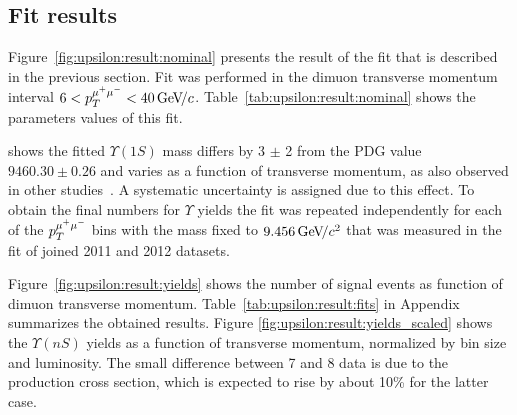 \subsection{Fit results}
\label{sec:upsilon:result}

Figure~\ref{fig:upsilon:result:nominal} presents the result of the fit that is
described in the previous section. Fit was performed in the dimuon
transverse momentum interval $ 6 < p_T^{\mu^+\mu^-} < 40 {\mathrm{\,Ge\kern -0.1em V\!/}c}$.
Table~\ref{tab:upsilon:result:nominal} shows the parameters values of this fit.







% 


 shows  the fitted $\Upsilon(1S)$
mass differs by 3 $\pm$ 2 \mevcc from the PDG value $9460.30 \pm  0.26$ \mevcc and
varies as a function of transverse momentum, as also observed in other
studies~\cite{Aaij:2013yaa}. A systematic uncertainty is assigned due to this
effect. To obtain the final numbers for $\Upsilon$ yields the fit was repeated
independently for each of the $p_T^{\mu^+\mu^-}$ bins with the \OneS mass fixed to
$9.456 {\mathrm{\,Ge\kern -0.1em V\!/}c^2}$ that was measured in the fit of joined 2011 and 2012 datasets.

Figure~\ref{fig:upsilon:result:yields} shows the number of signal events as
function of dimuon transverse momentum. Table~\ref{tab:upsilon:result:fits} in
Appendix summarizes the obtained results. Figure
\ref{fig:upsilon:result:yields_scaled} shows the $\Upsilon(nS)$ yields as a
function of transverse momentum, normalized by bin size and luminosity. The
small difference between 7 and 8 \tev data is due to the production cross
section, which is expected to rise by about 10\% for the latter case.




